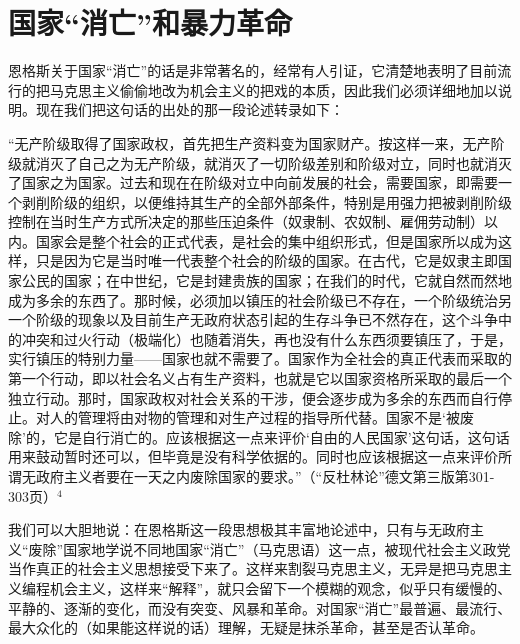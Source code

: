 \chapter{国家“消亡”和暴力革命} %

恩格斯关于国家“消亡”的话是非常著名的，经常有人引证，它清楚地表明了目前流行的把马克思主义偷偷地改为机会主义的把戏的本质，因此我们必须详细地加以说明。现在我们把这句话的出处的那一段论述转录如下：

\leftskip=10mm
\small

“无产阶级取得了国家政权，首先把生产资料变为国家财产。按这样一来，无产阶级就消灭了自己之为无产阶级，就消灭了一切阶级差别和阶级对立，同时也就消灭了国家之为国家。过去和现在在阶级对立中向前发展的社会，需要国家，即需要一个剥削阶级的组织，以便维持其生产的全部外部条件，特别是用强力把被剥削阶级控制在当时生产方式所决定的那些压迫条件（奴隶制、农奴制、雇佣劳动制）以内。国家会是整个社会的正式代表，是社会的集中组织形式，但是国家所以成为这样，只是因为它是当时唯一代表整个社会的阶级的国家。在古代，它是奴隶主即国家公民的国家；在中世纪，它是封建贵族的国家；在我们的时代，它就自然而然地成为多余的东西了。那时候，必须加以镇压的社会阶级已不存在，一个阶级统治另一个阶级的现象以及目前生产无政府状态引起的生存斗争已不然存在，这个斗争中的冲突和过火行动（极端化）也随着消失，再也没有什么东西须要镇压了，于是，实行镇压的特别力量——国家也就不需要了。国家作为全社会的真正代表而采取的第一个行动，即以社会名义占有生产资料，也就是它以国家资格所采取的最后一个独立行动。那时，国家政权对社会关系的干涉，便会逐步成为多余的东西而自行停止。对人的管理将由对物的管理和对生产过程的指导所代替。国家不是‘被废除’的，它是自行消亡的。应该根据这一点来评价‘自由的人民国家’这句话，这句话用来鼓动暂时还可以，但毕竟是没有科学依据的。同时也应该根据这一点来评价所谓无政府主义者要在一天之内废除国家的要求。”（“反杜林论”德文第三版第301-303页）$^{4}$

\pskip
\leftskip=0mm
\normalsize

我们可以大胆地说：在恩格斯这一段思想极其丰富地论述中，只有与无政府主义“废除”国家地学说不同地国家“消亡”（马克思语）这一点，被现代社会主义政党当作真正的社会主义思想接受下来了。这样来割裂马克思主义，无异是把马克思主义编程机会主义，这样来“解释”，就只会留下一个模糊的观念，似乎只有缓慢的、平静的、逐渐的变化，而没有突变、风暴和革命。对国家“消亡”最普遍、最流行、最大众化的（如果能这样说的话）理解，无疑是抹杀革命，甚至是否认革命。

